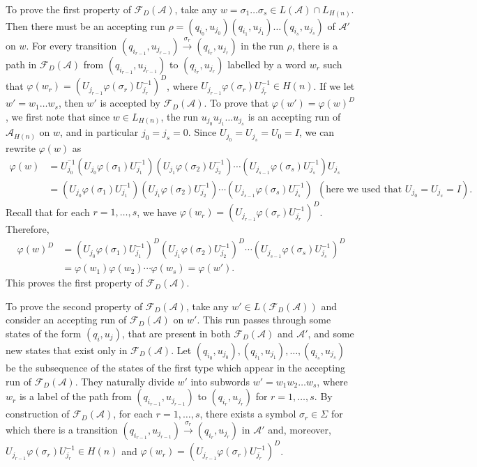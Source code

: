 \documentclass[fontsize=11pt,DIV=13,paper=letter]{scrartcl}
\theoremstyle{definition}
\newcommand{\A}{\mathcal{A}}
\newcommand{\F}{\mathcal{F}}
\renewcommand{\phi}{\varphi}
\begin{document}
To prove the first property of $\F_D(\A)$, take any $w=\sigma_1\dots \sigma_s\in L(\A)\cap L_{H(n)}$. Then there must be an accepting run $\rho=(q_{i_0},u_{j_0})(q_{i_1},u_{j_1})\dots (q_{i_s},u_{j_s})$ of $\A'$ on $w$. For every transition $(q_{i_{r-1}},u_{j_{r-1}})\xrightarrow{\sigma_r} (q_{i_r},u_{j_r})$ in the run $\rho$, there is a path in $\F_D(\A)$ from $(q_{i_{r-1}},u_{j_{r-1}})$ to $(q_{i_r},u_{j_r})$ labelled by a word $w_r$ such that $\phi(w_r)=(U^{}_{j_{r-1}}\phi(\sigma_r)U^{-1}_{j_r})^D$, where $U^{}_{j_{r-1}}\phi(\sigma_r)U^{-1}_{j_r}\in H(n)$. If we let $w'=w_1\dots w_s$, then $w'$ is accepted by $\F_D(\A)$. To prove that $\phi(w')=\phi(w)^D$, we first note that since $w\in L_{H(n)}$, the run $u_{j_0}u_{j_1}\dots u_{j_s}$ is an accepting run of $\A_{H(n)}$ on $w$, and in particular $j_0=j_s=0$. Since $U^{}_{j_0}=U^{}_{j_s}=U_0=I$, we can rewrite $\phi(w)$ as
\[
\begin{split}
\phi(w) &= U^{^-1}_{j_0}(U^{}_{j_0}\phi(\sigma_1)U_{j_1}^{-1})(U^{}_{j_1}\phi(\sigma_2)U_{j_2}^{-1})\cdots (U^{}_{j_{s-1}}\phi(\sigma_s)U_{j_s}^{-1})U^{}_{j_s}\\
&= (U^{}_{j_0}\phi(\sigma_1)U_{j_1}^{-1})(U^{}_{j_1}\phi(\sigma_2)U_{j_2}^{-1})\cdots (U^{}_{j_{s-1}}\phi(\sigma_s)U_{j_s}^{-1})\ \ (\text{here we used that } U^{}_{j_0}=U^{}_{j_s}=I).
\end{split}
\]
Recall that for each $r=1,\dots,s$, we have $\phi(w_r)=(U^{}_{j_{r-1}}\phi(\sigma_r)U^{-1}_{j_r})^D$. Therefore,
\[
\begin{split}
\phi(w)^D &= (U^{}_{j_0}\phi(\sigma_1)U_{j_1}^{-1})^D(U^{}_{j_1}\phi(\sigma_2)U_{j_2}^{-1})^D\cdots (U^{}_{j_{s-1}}\phi(\sigma_s)U_{j_s}^{-1})^D\\
&= \phi(w_1)\phi(w_2) \cdots \phi(w_s) = \phi(w').
\end{split}
\]
This proves the first property of $\F_D(\A)$.

To prove the second property of $\F_D(\A)$, take any $w'\in L(\F_D(\A))$ and consider an accepting run of $\F_D(\A)$ on $w'$. This run passes through some states of the form $(q_i,u_j)$, that are present in both $\F_D(\A)$ and $\A'$, and some new states that exist only in $\F_D(\A)$. Let $(q_{i_0},u_{j_0}),(q_{i_1},u_{j_1}),\dots,(q_{i_s},u_{j_s})$ be the subsequence of the states of the first type which appear in the accepting run of $\F_D(\A)$. They naturally divide $w'$ into subwords $w'=w_1w_2\dots w_s$, where $w_r$ is a label of the path from $(q_{i_{r-1}},u_{j_{r-1}})$ to $(q_{i_r},u_{j_r})$ for $r=1,\dots,s$. By construction of $\F_D(\A)$, for each $r=1,\dots,s$, there exists a symbol $\sigma_r\in \Sigma$ for which there is a transition $(q_{i_{r-1}},u_{j_{r-1}})\xrightarrow{\sigma_r} (q_{i_r},u_{j_r})$ in $\A'$ and, moreover, $U^{}_{j_{r-1}}\phi(\sigma_r)U^{-1}_{j_r}\in H(n)$ and $\phi(w_r) = (U^{}_{j_{r-1}}\phi(\sigma_r)U^{-1}_{j_r})^D$.
\end{document}
